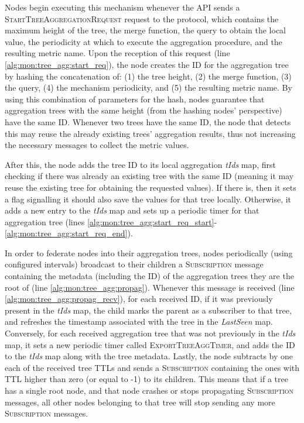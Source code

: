 

Nodes begin executing this mechanism whenever the API sends a \textsc{StartTreeAggregationRequest} request to the protocol, which contains the maximum height of the tree, the merge function, the query to obtain the local value, the periodicity at which to execute the aggregation procedure, and the resulting metric name. Upon the reception of this request (line \ref{alg:mon:tree_agg:start_req}), the node creates the ID for the aggregation tree by hashing the concatenation of: (1) the tree height, (2) the merge function, (3) the query, (4) the mechanism periodicity, and (5) the resulting metric name. By using this combination of parameters for the hash, nodes guarantee that aggregation trees with the same height (from the hashing nodes' perspective) have the same ID. Whenever two trees have the same ID, the node that detects this may reuse the already existing trees' aggregation results, thus not increasing the necessary messages to collect the metric values.
 
 After this, the node adds the tree ID to its local aggregation \textit{tIds} map, first checking if there was already an existing tree with the same ID (meaning it may reuse the existing tree for obtaining the requested values). If there is, then it sets a flag signalling it should also save the values for that tree locally. Otherwise, it adds a new entry to the \textit{tIds} map and sets up a periodic timer for that aggregation tree (lines \ref{alg:mon:tree_agg:start_req_start}-\ref{alg:mon:tree_agg:start_req_end}).

In order to federate nodes into their aggregation trees, nodes periodically (using configured intervals) broadcast to their children a \textsc{Subscription} message containing the metadata (including the ID) of the aggregation trees they are the root of (line \ref{alg:mon:tree_agg:propag}). Whenever this message is received (line \ref{alg:mon:tree_agg:propag_recv}), for each received ID, if it was previously present in the \textit{tIds} map, the child marks the parent as a subscriber to that tree, and refreshes the timestamp associated with the tree in the \textit{LastSeen} map. Conversely, for each received aggregation tree that was not previously in the \textit{tIds} map, it sets a new periodic timer called \textsc{ExportTreeAggTimer}, and adds the ID to the \textit{tIds} map along with the tree metadata. Lastly, the node subtracts by one each of the received tree TTLs and sends a \textsc{Subscription} containing the ones with TTL higher than zero (or equal to -1) to its children. This means that if a tree has a single root node, and that node crashes or stops propagating \textsc{Subscription} messages, all other nodes belonging to that tree will stop sending any more \textsc{Subscription} messages.

